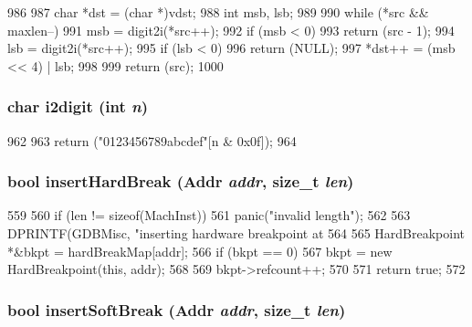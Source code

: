 \begin{DoxyCode}
986 {
987     char *dst = (char *)vdst;
988     int msb, lsb;
989 
990     while (*src && maxlen--) {
991         msb = digit2i(*src++);
992         if (msb < 0)
993             return (src - 1);
994         lsb = digit2i(*src++);
995         if (lsb < 0)
996             return (NULL);
997         *dst++ = (msb << 4) | lsb;
998     }
999     return (src);
1000 }
\end{DoxyCode}
\hypertarget{classBaseRemoteGDB_a380e69e2af0b61c399efe68818bed2e2}{
\subsubsection[{i2digit}]{\setlength{\rightskip}{0pt plus 5cm}char i2digit (int {\em n})}}
\label{classBaseRemoteGDB_a380e69e2af0b61c399efe68818bed2e2}



\begin{DoxyCode}
962 {
963     return ("0123456789abcdef"[n & 0x0f]);
964 }
\end{DoxyCode}
\hypertarget{classBaseRemoteGDB_a6a65f23f1e316fc2362cced431fa2335}{
\subsubsection[{insertHardBreak}]{\setlength{\rightskip}{0pt plus 5cm}bool insertHardBreak ({\bf Addr} {\em addr}, \/  size\_\-t {\em len})}}
\label{classBaseRemoteGDB_a6a65f23f1e316fc2362cced431fa2335}



\begin{DoxyCode}
559 {
560     if (len != sizeof(MachInst))
561         panic("invalid length\n");
562 
563     DPRINTF(GDBMisc, "inserting hardware breakpoint at %
564 
565     HardBreakpoint *&bkpt = hardBreakMap[addr];
566     if (bkpt == 0)
567         bkpt = new HardBreakpoint(this, addr);
568 
569     bkpt->refcount++;
570 
571     return true;
572 }
\end{DoxyCode}
\hypertarget{classBaseRemoteGDB_a1b9e575ee171c687b3ae8516ae5f8b06}{
\subsubsection[{insertSoftBreak}]{\setlength{\rightskip}{0pt plus 5cm}bool insertSoftBreak ({\bf Addr} {\em addr}, \/  size\_\-t {\em len})}}
\label{classBaseRemoteGDB_a1b9e575ee171c687b3ae8516ae5f8b06}



